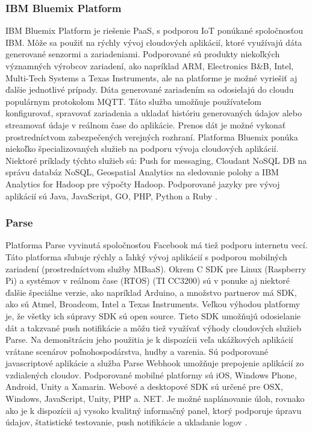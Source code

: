 \documentclass[twoside]{ctuthesis}
\theoremstyle{plain}
\theoremstyle{definition}
\theoremstyle{note}
\begin{document}
\subsubsection{IBM Bluemix Platform} 
IBM Bluemix Platform je riešenie PaaS, s podporou IoT ponúkané spoločnosťou IBM. Môže sa použiť na rýchly vývoj cloudových aplikácií, ktoré využívajú dáta generované senzormi a zariadeniami. Podporované sú produkty niekoľkých významných výrobcov zariadení, ako napríklad ARM, Electronics B\&B, Intel, Multi-Tech Systems a Texas Instruments, ale na platforme je možné vyriešiť aj ďalšie jednotlivé prípady. Dáta generované zariadením sa odosielajú do cloudu populárnym protokolom MQTT. Táto služba umožňuje používateľom konfigurovať, spravovať zariadenia a ukladať históriu generovaných údajov alebo streamovať údaje v reálnom čase do aplikácie. Prenos dát je možné vykonať prostredníctvom zabezpečených verejných rozhraní.
Platforma Bluemix ponúka niekoľko špecializovaných služieb na podporu vývoja cloudových aplikácií. Niektoré príklady týchto služieb sú: Push for messaging, Cloudant NoSQL DB na správu databáz NoSQL, Geospatial Analytics na sledovanie polohy a IBM Analytics for Hadoop pre výpočty Hadoop. Podporované jazyky pre vývoj aplikácií sú Java, JavaScript, GO, PHP, Python a Ruby  \cite{iotcloud}.

\subsubsection{Parse} 
Platforma Parse vyvinutá spoločnosťou Facebook má tiež podporu internetu vecí. Táto platforma sľubuje rýchly a ľahký vývoj aplikácií s podporou mobilných zariadení (prostredníctvom služby MBaaS). Okrem C SDK pre Linux (Raspberry Pi) a systémov v reálnom čase (RTOS) (TI CC3200) sú v ponuke aj niektoré ďalšie špeciálne verzie, ako napríklad Arduino, a množstvo partnerov má SDK, ako sú Atmel, Broadcom, Intel a Texas Instruments. Veľkou výhodou platformy je, že všetky ich súpravy SDK sú open source. Tieto SDK umožňujú odosielanie dát a takzvané push notifikácie a môžu tiež využívať výhody cloudových služieb Parse. Na demonštráciu jeho použitia je k dispozícii veľa ukážkových aplikácií vrátane scenárov poľnohospodárstva, hudby a varenia. Sú podporované javascriptové aplikácie a služba Parse Webhook umožňuje prepojenie aplikácií zo vzdialených cloudov. Podporované mobilné platformy sú iOS, Windows Phone, Android, Unity a Xamarin. Webové a desktopové SDK sú určené pre OSX, Windows, JavaScript, Unity, PHP a. NET. Je možné naplánovanie úloh, rovnako ako je k dispozícii aj vysoko kvalitný informačný panel, ktorý podporuje úpravu údajov, štatistické testovanie, push notifikácie a ukladanie logov  \cite{iotcloud}.
\end{document}
